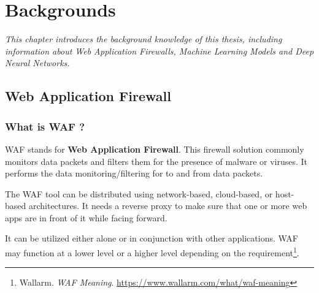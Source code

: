 \chapter{Backgrounds}
\label{chap:backgrounds}
	\textit{This chapter introduces the background knowledge of this thesis, including information about Web Application Firewalls, Machine Learning Models and Deep Neural Networks.}
\minitoc

\section{Web Application Firewall} 
\label{sec:waf}
	
\subsection{What is WAF ?}
\label{subsec:waf_def}
WAF stands for \textbf{Web Application Firewall}. This firewall solution commonly monitors data packets and filters them for the presence of malware or viruses. It performs the data monitoring/filtering for to and from data packets.  

The WAF tool can be distributed using network-based, cloud-based, or host-based architectures. It needs a reverse proxy to make sure that one or more web apps are in front of it while facing forward. 

It can be utilized either alone or in conjunction with other applications. WAF may function at a lower level or a higher level depending on the requirement\footnote{\label{wallarm} Wallarm. \textit{WAF Meaning}. \url{https://www.wallarm.com/what/waf-meaning}}.


